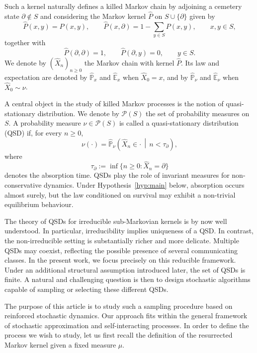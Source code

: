 \documentclass[10pt,letterpaper]{article}
\theoremstyle{compactplain}
\theoremstyle{compactdefinition}
\newcommand{\1}{\mathds{1}}
\begin{document}
Such a kernel naturally defines a killed Markov chain by adjoining a cemetery
state \(\partial\notin S\) and considering the Markov kernel \(\widehat P\) on
\(S\cup\{\partial\}\) given by
\[
\widehat P(x,y)=P(x,y),
\qquad
\widehat P(x,\partial)=1-\sum_{y\in S}P(x,y),
\qquad x,y\in S,
\]
together with
\[
\widehat P(\partial,\partial)=1,
\qquad
\widehat P(\partial,y)=0,
\qquad y\in S.
\]
We denote by \((\widehat X_n)_{n\geq0}\) the Markov chain with kernel
\(\widehat P\). Its law and expectation are denoted by
\(\widehat{\mathbb P}_x\) and \(\widehat{\mathbb E}_x\) when
\(\widehat X_0=x\), and by \(\widehat{\mathbb P}_\nu\) and
\(\widehat{\mathbb E}_\nu\) when \(\widehat X_0\sim\nu\).



A central object in the study of killed Markov processes is the notion of quasi-stationary distribution. We denote by \(\mathcal P(S)\) the set of probability measures on \(S\). A probability measure \(\nu\in\mathcal P(S)\) is called a quasi-stationary distribution (QSD) if, for every
\(n\geq0\),
\[
\nu(\cdot)
=
\widehat{\mathbb P}_\nu
\left(
\widehat X_n\in\cdot
\,\middle|\,
n<\tau_\partial
\right),
\]
where
\[
\tau_\partial:=\inf\{n\geq0:\widehat X_n=\partial\}
\]
denotes the absorption time.
QSDs play the role of invariant measures for non-conservative dynamics. Under Hypothesis~\ref{hyp:main} below, absorption occurs almost surely, but
the law conditioned on survival may exhibit a non-trivial equilibrium
behaviour.

\medskip{}

The theory of QSDs for irreducible sub-Markovian kernels is by now well understood. In particular, irreducibility implies uniqueness of a QSD. In contrast, the non-irreducible setting is substantially richer and more delicate. Multiple QSDs may coexist, reflecting the possible presence of several communicating classes. In the present work, we focus precisely on this reducible framework. Under an additional structural assumption introduced later, the set of QSDs is finite. A natural and challenging question is then to design stochastic algorithms capable of sampling or selecting these different QSDs.

The purpose of this article is to study such a sampling procedure based on reinforced stochastic dynamics. Our approach fits within the general framework of stochastic approximation and self-interacting processes. In order to define the process we wish to study, let us first recall the definition of the resurrected Markov kernel given a fixed measure $\mu$.
\end{document}
